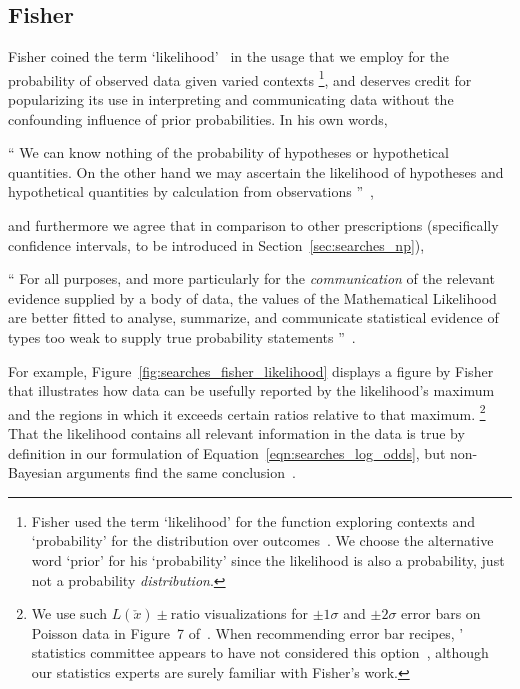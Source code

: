\subsection{Fisher}
\label{sec:searches_fisher}
Fisher coined the term `likelihood'~\cite{
fisher1912fitting,
fisher1915frequency,
fisher1921probable,
fisher1922estimators
} in the usage that
we employ for the probability of observed data given varied
contexts%
\footnote{%
Fisher used the term `likelihood' for the function exploring
contexts and `probability' for the distribution over
outcomes~\cite{fisher1925smrw}.
We choose the alternative word `prior' for his `probability' since the
likelihood is also a probability, just not a probability \emph{distribution}.
},
and deserves credit for popularizing its use in interpreting and communicating
data without the confounding influence of prior probabilities.
In his own words,%
\begin{displayquote}
\small
``%
We can know nothing of the probability of hypotheses or hypothetical
quantities.
On the other hand we may ascertain the likelihood of hypotheses
and hypothetical quantities by calculation from observations%
''~\cite{fisher1921probable},
\end{displayquote}
and furthermore we agree that in comparison to other prescriptions
(specifically confidence intervals, to be introduced in
Section~\ref{sec:searches_np}),
\begin{displayquote}
\small
``%
For all purposes, and more particularly for the \textit{communication} of the
relevant evidence supplied by a body of data, the values of the Mathematical
Likelihood are better fitted to analyse, summarize, and communicate
statistical evidence of types too weak to supply true probability statements%
''~\cite{fisher1956statistical}.
\end{displayquote}
For example, Figure~\ref{fig:searches_fisher_likelihood} displays a figure by
Fisher~\cite{fisher1956statistical} that illustrates how data can be usefully
reported by the likelihood's maximum and the regions in which it exceeds
certain ratios relative to that maximum.%
\footnote{%
We use such $L(\check{x})\pm\mathrm{ratio}$ visualizations for
$\pm1\sigma$ and $\pm2\sigma$ error bars on Poisson data in
Figure~7 of~\cite{lester2022hunting}.
When recommending error bar recipes, \atlas' statistics committee appears
to have not considered this option~\cite{cowan2011errorbars}, although
our statistics experts are surely familiar with Fisher's work.
}
That the likelihood contains all relevant information in the data is true by
definition in our formulation of Equation~\ref{eqn:searches_log_odds},
but non-Bayesian arguments find the same conclusion~\cite{
birnbaum1962foundations,
savage1962foundations
}.

